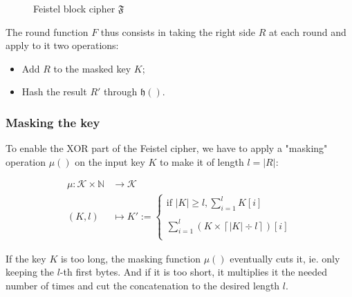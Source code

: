 \documentclass[twoside,twocolumn]{article}
\newcommand{\ceil}[1]{\left\lceil #1 \right\rceil}
\theoremstyle{definition}
\theoremstyle{remark}
\begin{document}
\begin{figure}
    \caption{Feistel block cipher $\mathfrak{F}$}
    \label{fig:feistel}
\end{figure}

The round function $F$ thus consists in taking the right side $R$ at each round and apply to it two operations:
\begin{itemize}
    \item Add $R$ to the masked key $K$;
    \item Hash the result $R'$ through $\mathfrak{h}()$.
\end{itemize} 

\subsubsection{Masking the key}

To enable the XOR part of the Feistel cipher, we have to apply a "masking" operation $\mu()$ on the input key $K$ to make it of length $l = |R|$:
\begin{small}
    \begin{equation}
        \label{eq:masking}
        \begin{array}{rl}
            \mu: \mathcal{K} \times \mathbb{N} &\to \mathcal{K} \\
            (K, l) &\mapsto K' := \left\{
                \begin{array}{l}
                    \textrm{if } |K| \geq l, \sum_{i=1}^l K[i] \\ \\
                    \sum_{i=1}^l (K \times \ceil{|K| \div l})[i] \\
                \end{array}
            \right.
        \end{array}
    \end{equation}
\end{small}
If the key $K$ is too long, the masking function $\mu()$ eventually cuts it, ie. only keeping the $l$-th first bytes.
And if it is too short, it multiplies it the needed number of times and cut the concatenation to the desired length $l$.
\end{document}
